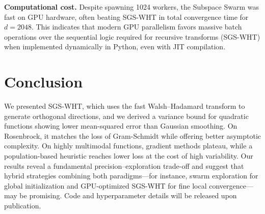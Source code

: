 \documentclass[11pt,a4paper]{article}
\begin{document}
\newpage

\textbf{Computational cost.} Despite spawning 1024 workers, the Subspace Swarm was fast on GPU hardware, often beating SGS-WHT in total convergence time for $d=2048$. This indicates that modern GPU parallelism favors massive batch operations over the sequential logic required for recursive transforms (SGS-WHT) when implemented dynamically in Python, even with JIT compilation.

\section{Conclusion}
We presented SGS-WHT, which uses the fast Walsh–Hadamard transform to generate orthogonal directions, and we derived a variance bound for quadratic functions showing lower mean-squared error than Gaussian smoothing. On Rosenbrock, it matches the loss of Gram-Schmidt while offering better asymptotic complexity. On highly multimodal functions, gradient methods plateau, while a population-based heuristic reaches lower loss at the cost of high variability. Our results reveal a fundamental precision–exploration trade-off and suggest that hybrid strategies combining both paradigms—for instance, swarm exploration for global initialization and GPU-optimized SGS-WHT for fine local convergence—may be promising. Code and hyperparameter details will be released upon publication.



\end{document}
